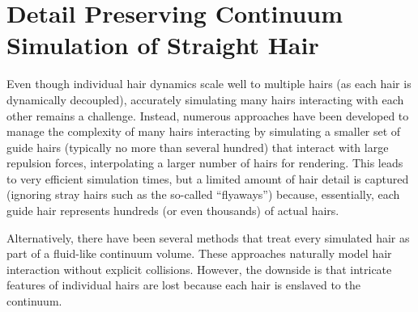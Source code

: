 
\chapter{Detail Preserving Continuum Simulation of Straight Hair}\label{chap:hair}
%


Even though individual hair dynamics scale well to multiple hairs (as each hair
is dynamically decoupled), accurately simulating many hairs interacting with
each other remains a challenge.  Instead, numerous approaches have been
developed to manage the complexity of many hairs interacting by simulating a
smaller set of guide hairs (typically no more than several hundred) that
interact with large repulsion forces, interpolating a larger number of hairs for
rendering. This leads to very efficient simulation times, but a limited amount
of hair detail is captured (ignoring stray hairs such as the
so-called ``flyaways'') because, essentially, each guide hair represents
hundreds (or even thousands) of actual hairs.

Alternatively, there have been several methods that treat every simulated hair
as part of a fluid-like continuum volume. These approaches naturally model hair
interaction without explicit collisions. However, the downside is that intricate
features of individual hairs are lost because each hair is enslaved to the
continuum.


